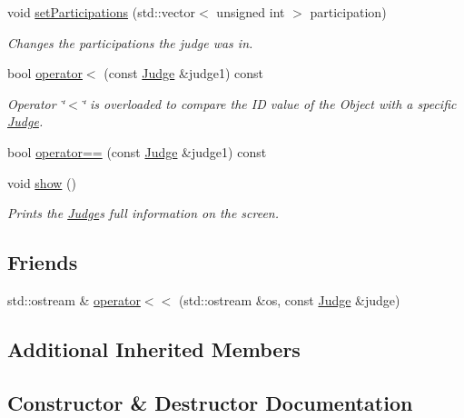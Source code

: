 \begin{DoxyCompactItemize}
void \hyperlink{class_judge_ab6bf287475108075c5c95f3fa0d7e6b0}{set\+Participations} (std\+::vector$<$ unsigned int $>$ participation)
\begin{DoxyCompactList}\small\item\em Changes the participations the judge was in. \end{DoxyCompactList}\item 
bool \hyperlink{class_judge_a748c3fae9d2a6cea4952d31ebe2bb660}{operator$<$} (const \hyperlink{class_judge}{Judge} \&judge1) const
\begin{DoxyCompactList}\small\item\em Operator \char`\"{}$<$\char`\"{} is overloaded to compare the ID value of the Object with a specific \hyperlink{class_judge}{Judge}. \end{DoxyCompactList}\item 
bool \hyperlink{class_judge_ab3a06af6dc3a2f5f427c146e2b1a4573}{operator==} (const \hyperlink{class_judge}{Judge} \&judge1) const
\item 
\mbox{\label{class_judge_a54d7671b2a8d4fb249378914c9ae1746}} 
void \hyperlink{class_judge_a54d7671b2a8d4fb249378914c9ae1746}{show} ()
\begin{DoxyCompactList}\small\item\em Prints the \hyperlink{class_judge}{Judge}\textquotesingle{}s full information on the screen. \end{DoxyCompactList}\end{DoxyCompactItemize}
\subsection*{Friends}
\begin{DoxyCompactItemize}
\item 
std\+::ostream \& \hyperlink{class_judge_ad83f9941c7a7e0ae112d4fcf186f86cb}{operator$<$$<$} (std\+::ostream \&os, const \hyperlink{class_judge}{Judge} \&judge)
\end{DoxyCompactItemize}
\subsection*{Additional Inherited Members}


\subsection{Constructor \& Destructor Documentation}
\mbox{\label{class_judge_ad8e4c64a5b1cb72fc4f1f907117d97c3}} 
